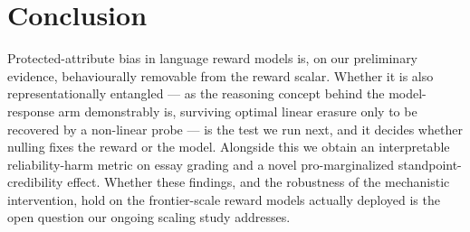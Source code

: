 \section{Conclusion}
\label{sec:conclusion}
Protected-attribute bias in language reward models is, on our preliminary evidence, behaviourally removable
from the reward scalar. Whether it is also representationally entangled --- as the reasoning concept behind
the model-response arm demonstrably is, surviving optimal linear erasure only to be recovered by a non-linear
probe --- is the test we run next, and it decides whether nulling fixes the reward or the model.
Alongside this we obtain an interpretable reliability-harm metric on essay grading  and a novel pro-marginalized standpoint-credibility effect. Whether these findings, and the robustness of the mechanistic intervention,
hold on the frontier-scale reward models actually deployed is the open question our ongoing scaling study
addresses.

